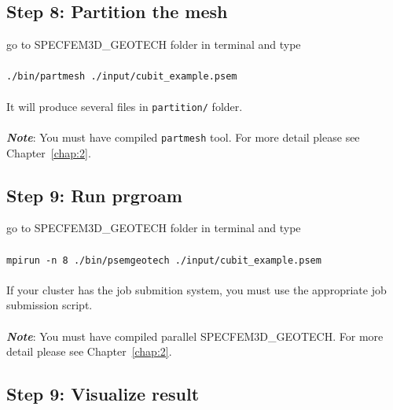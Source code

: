 \subsection*{Step 8: Partition the mesh}

go to SPECFEM3D\_GEOTECH folder in terminal and type\\
\\
\texttt{./bin/partmesh ./input/cubit\_example.psem}\\
\\
It will produce several files in \texttt{partition/} folder.\\
\\
\textbf{\emph{Note}}: You must have compiled \texttt{partmesh} tool. For more detail please see Chapter~\ref{chap:2}.

\subsection*{Step 9: Run prgroam}

go to SPECFEM3D\_GEOTECH folder in terminal and type\\
\\
\texttt{mpirun -n 8 ./bin/psemgeotech ./input/cubit\_example.psem}\\
\\
If your cluster has the job submition system, you must use the appropriate job submission script.\\
\\

\textbf{\emph{Note}}: You must have compiled parallel SPECFEM3D\_GEOTECH. For more detail please see Chapter~\ref{chap:2}.

\subsection*{Step 9: Visualize result}

